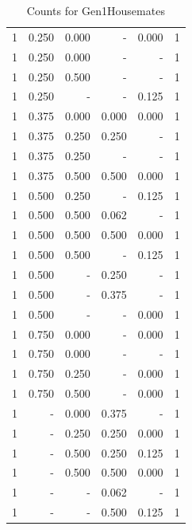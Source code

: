 \documentclass[a4paper]{article}\usepackage[]{graphicx}\usepackage[]{color}
\begin{document}
\begin{table}[ht]
\begin{tabular}{rrrrrr}
  1 & 0.250 & 0.000 & - & 0.000 & 1 \\ 
  1 & 0.250 & 0.000 & - & - & 1 \\ 
  1 & 0.250 & 0.500 & - & - & 1 \\ 
   \rowcolor{nullColor} 1 & 0.250 & - & - & 0.125 & 1 \\ 
   \rowcolor{goodColor} 1 & 0.375 & 0.000 & 0.000 & 0.000 & 1 \\ 
   \rowcolor{goodColor} 1 & 0.375 & 0.250 & 0.250 & - & 1 \\ 
  1 & 0.375 & 0.250 & - & - & 1 \\ 
   \rowcolor{goodColor} 1 & 0.375 & 0.500 & 0.500 & 0.000 & 1 \\ 
  1 & 0.500 & 0.250 & - & 0.125 & 1 \\ 
   \rowcolor{badColor} 1 & 0.500 & 0.500 & 0.062 & - & 1 \\ 
   \rowcolor{goodColor} 1 & 0.500 & 0.500 & 0.500 & 0.000 & 1 \\ 
  1 & 0.500 & 0.500 & - & 0.125 & 1 \\ 
   \rowcolor{sosoColor} 1 & 0.500 & - & 0.250 & - & 1 \\ 
   \rowcolor{sosoColor} 1 & 0.500 & - & 0.375 & - & 1 \\ 
   \rowcolor{nullColor} 1 & 0.500 & - & - & 0.000 & 1 \\ 
  1 & 0.750 & 0.000 & - & 0.000 & 1 \\ 
  1 & 0.750 & 0.000 & - & - & 1 \\ 
  1 & 0.750 & 0.250 & - & 0.000 & 1 \\ 
  1 & 0.750 & 0.500 & - & 0.000 & 1 \\ 
   \rowcolor{badColor} 1 & - & 0.000 & 0.375 & - & 1 \\ 
   \rowcolor{goodColor} 1 & - & 0.250 & 0.250 & 0.000 & 1 \\ 
   \rowcolor{badColor} 1 & - & 0.500 & 0.250 & 0.125 & 1 \\ 
   \rowcolor{goodColor} 1 & - & 0.500 & 0.500 & 0.000 & 1 \\ 
   \rowcolor{sosoColor} 1 & - & - & 0.062 & - & 1 \\ 
   \rowcolor{sosoColor} 1 & - & - & 0.500 & 0.125 & 1 \\ 
   \hline
\end{tabular}
\caption{Counts for Gen1Housemates} 
\end{table}
\end{document}
